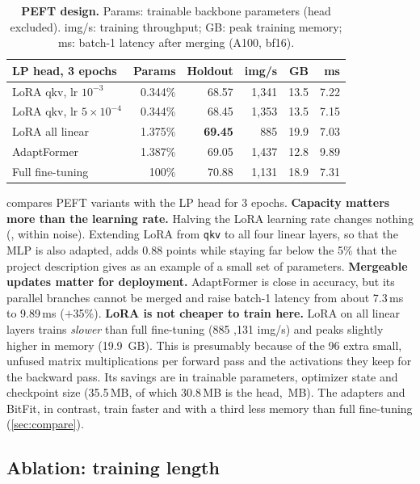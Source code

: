 \begin{table}[t]
  \centering
  \footnotesize
  \setlength{\tabcolsep}{3pt}
  \begin{tabular}{@{}lrrrrr@{}}
    \toprule
    LP head, 3 epochs & Params & Holdout & img/s & GB & ms \\
    \midrule
    LoRA qkv, lr $10^{-3}$ & 0.344\% & 68.57 & 1,341 & 13.5 & 7.22 \\
    LoRA qkv, lr $5{\times}10^{-4}$ & 0.344\% & 68.45 & 1,353 & 13.5 & 7.15 \\
    LoRA all linear & 1.375\% & \textbf{69.45} & 885 & 19.9 & 7.03 \\
    AdaptFormer & 1.387\% & 69.05 & 1,437 & 12.8 & 9.89 \\
    \midrule
    Full fine-tuning & 100\% & 70.88 & 1,131 & 18.9 & 7.31 \\
    \bottomrule
  \end{tabular}
  \caption{\textbf{PEFT design.} Params: trainable backbone parameters (head excluded). img/s: training throughput; GB: peak training memory; ms: batch-1 latency after merging (A100, bf16).}
  \label{tab:peft}
\end{table}

 compares PEFT variants with the LP head for 3 epochs.
\textbf{Capacity matters more than the learning rate.}
Halving the LoRA learning rate changes nothing (, within noise).
Extending LoRA from \texttt{qkv} to all four linear layers, so that the MLP is also adapted, adds 0.88 points while staying far below the 5\% that the project description gives as an example of a small set of parameters.
\textbf{Mergeable updates matter for deployment.}
AdaptFormer is close in accuracy, but its parallel branches cannot be merged and raise batch-1 latency from about 7.3\,ms to 9.89\,ms ($+$35\%).
\textbf{LoRA is not cheaper to train here.}
LoRA on all linear layers trains \emph{slower} than full fine-tuning (885 ,131 img/s) and peaks slightly higher in memory (19.9 \,GB).
This is presumably because of the 96 extra small, unfused matrix multiplications per forward pass and the activations they keep for the backward pass.
Its savings are in trainable parameters, optimizer state and checkpoint size (35.5\,MB, of which 30.8\,MB is the head, \,MB).
The adapters and BitFit, in contrast, train faster and with a third less memory than full fine-tuning (\cref{sec:compare}).

\subsection{Ablation: training length}
\label{sec:ablation-length}

